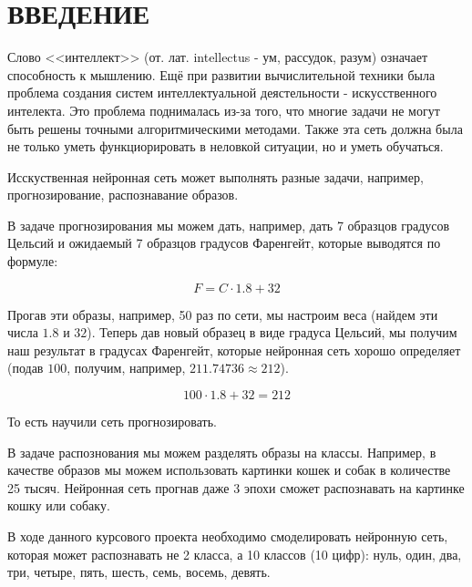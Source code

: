 \section*{ВВЕДЕНИЕ} %
{} %

Слово <<интеллект>> (от. лат. intellectus - ум, рассудок, разум)
означает способность к мышлению.
Ещё при развитии вычислительной техники была проблема создания систем
интеллектуальной деястельности - искусственного интелекта.
Это проблема поднималась из-за того,
что многие задачи не могут быть решены точными алгоритмическими методами.
Также эта сеть должна была не только уметь функциорировать в неловкой ситуации,
но и уметь обучаться.

Исскуственная нейронная сеть может выполнять разные задачи,
например, прогнозирование, распознавание образов.

В задаче прогнозирования мы можем дать,
например, дать 7 образцов градусов Цельсий
и ожидаемый 7 образцов градусов Фаренгейт,
которые выводятся по формуле:

$$F = C \cdot 1.8 + 32$$

Прогав эти образы, например, 50 раз по сети,
мы настроим веса (найдем эти числа $1.8$ и $32$).
Теперь дав новый образец в виде градуса Цельсий,
мы получим наш результат в градусах Фаренгейт,
которые нейронная сеть хорошо определяет
(подав $100$, получим, например, $211.74736 \approx 212$).

$$100 \cdot 1.8 + 32 = 212$$

То есть научили сеть прогнозировать.

В задаче распознования мы можем разделять образы на классы.
Например, в качестве образов мы можем использовать картинки кошек и собак в количестве 25 тысяч.
Нейронная сеть прогнав даже 3 эпохи сможет распознавать на картинке кошку или собаку.

В ходе данного курсового проекта необходимо смоделировать нейронную сеть,
которая может распознавать не 2 класса,
а 10 классов (10 цифр):
нуль, один, два, три, четыре, пять, шесть, семь, восемь, девять.
